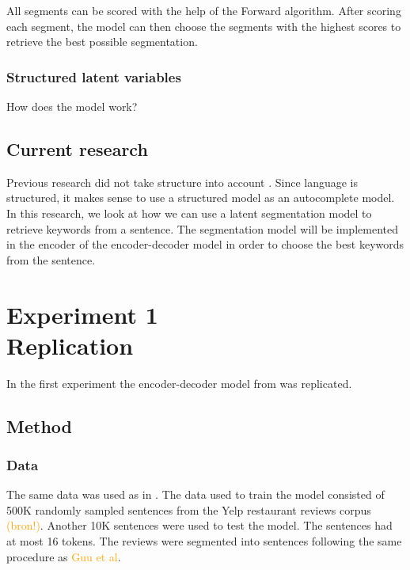 \documentclass[a4paper, 12pt]{report}
\begin{document}
All segments can be scored with the help of the Forward algorithm. 
After scoring each segment, the model can then choose the segments with the highest scores to retrieve the best possible segmentation. 

\subsection{Structured latent variables}
How does the model work? 

\section{Current research}

Previous research did not take structure into account \cite{autocomplete, Bar-YossefZiv2011Cqa, SvyatkovskiyAlexey2019PACC}.
Since language is structured, it makes sense to use a structured model as an autocomplete model. 
In this research, we look at how we can use a latent segmentation model to retrieve keywords from a sentence. 
The segmentation model will be implemented in the encoder of the encoder-decoder model in order to choose the best keywords from the sentence.

\chapter{Experiment 1 \\ Replication}
In the first experiment the encoder-decoder model from  was replicated. 

\section{Method}

\subsection{Data}
The same data was used as in .
The data used to train the model consisted of 500K randomly sampled sentences from the Yelp restaurant reviews corpus \textcolor{orange}{(bron!)}.
Another 10K sentences were used to test the model. 
The sentences had at most 16 tokens. 
The reviews were segmented into sentences following the same procedure as \textcolor{orange}{Guu et al}. 
\end{document}
